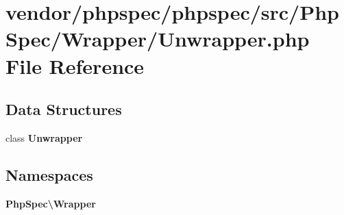 \section{vendor/phpspec/phpspec/src/\+Php\+Spec/\+Wrapper/\+Unwrapper.php File Reference}
\label{_unwrapper_8php}
\subsection*{Data Structures}
\begin{DoxyCompactItemize}
\item 
class {\bf Unwrapper}
\end{DoxyCompactItemize}
\subsection*{Namespaces}
\begin{DoxyCompactItemize}
\item 
 {\bf Php\+Spec\textbackslash{}\+Wrapper}
\end{DoxyCompactItemize}
